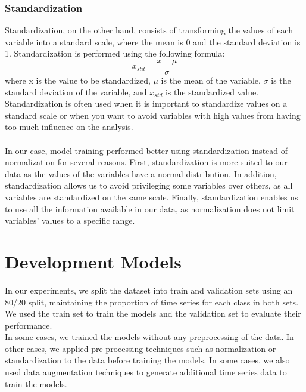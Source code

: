 \documentclass[11pt, oneside]{article}
\begin{document}
\subsubsection{Standardization}
Standardization, on the other hand, consists of transforming the values of each variable into a standard scale, where the mean is 0 and the standard deviation is 1. Standardization is performed using the following formula:
\[x_{std} = \frac{x - \mu}{\sigma} \]
where x is the value to be standardized, $\mu$ is the mean of the variable, $\sigma$ is the standard deviation of the variable, and $x_{std}$ is the standardized value.
Standardization is often used when it is important to standardize values on a standard scale or when you want to avoid variables with high values from having too much influence on the analysis.\\\\
In our case, model training performed better using standardization instead of normalization for several reasons. First, standardization is more suited to our data as the values of the variables have a normal distribution. In addition, standardization allows us to avoid privileging some variables over others, as all variables are standardized on the same scale. Finally, standardization enables us to use all the information available in our data, as normalization does not limit variables' values to a specific range.

\section{Development Models}
In our experiments, we split the dataset into train and validation sets using an 80/20 split, maintaining the proportion of time series for each class in both sets. We used the train set to train the models and the validation set to evaluate their performance.\\
In some cases, we trained the models without any preprocessing of the data. In other cases, we applied pre-processing techniques such as normalization or standardization to the data before training the models. In some cases, we also used data augmentation techniques to generate additional time series data to train the models.
\end{document}

